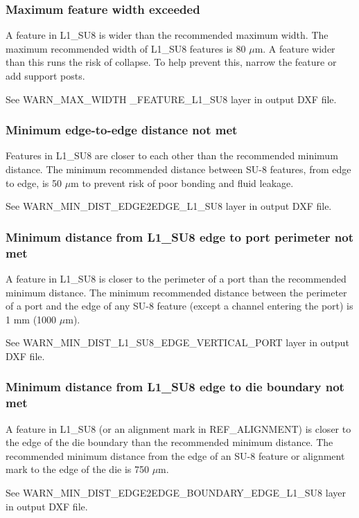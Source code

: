 \documentclass[twoside]{article}
\begin{document}
\subsubsection{Maximum feature width exceeded}
\par A feature in L1\_SU8 is wider than the recommended maximum width. The
maximum recommended width of L1\_SU8 features is 80 $\mu$m. A feature wider than
this runs the risk of collapse. To help prevent this, narrow the feature or add
support posts.  \par See WARN\_MAX\_WIDTH \_FEATURE\_L1\_SU8 layer in output DXF
file.

\subsubsection{Minimum edge-to-edge distance not met}
\par Features in L1\_SU8 are closer to each other than the recommended minimum
distance. The minimum recommended distance between SU-8 features, from edge to
edge, is 50 $\mu$m to prevent risk of poor bonding and fluid leakage.  \par See
WARN\_MIN\_DIST\_EDGE2EDGE\_L1\_SU8 layer in output DXF file.

\subsubsection{Minimum distance from L1\_SU8 edge to port perimeter not met}
\par A feature in L1\_SU8 is closer to the perimeter of a port than the
recommended minimum distance. The minimum recommended distance between the
perimeter of a port and the edge of any SU-8 feature (except a channel entering
the port) is 1 mm (1000 $\mu$m).  \par See
WARN\_MIN\_DIST\_L1\_SU8\_EDGE\_VERTICAL\_PORT layer in output DXF file.

\subsubsection{Minimum distance from L1\_SU8 edge to die boundary not met}
\par A feature in L1\_SU8 (or an alignment mark in REF\_ALIGNMENT) is closer to
the edge of the die boundary than the recommended minimum distance. The
recommended minimum distance from the edge of an SU-8 feature or alignment mark
to the edge of the die is 750 $\mu$m.  \par See
WARN\_MIN\_DIST\_EDGE2EDGE\_BOUNDARY\_EDGE\_L1\_SU8 layer in output DXF file.
\end{document}

